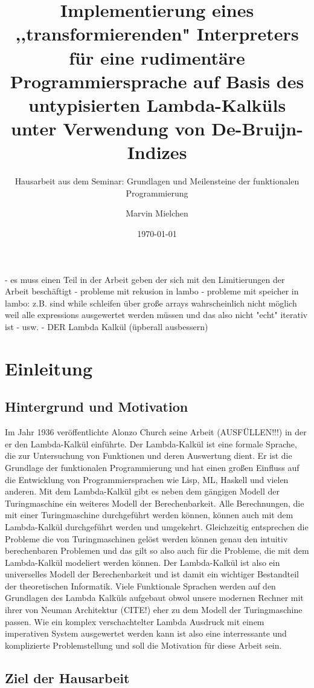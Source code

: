 \documentclass[ngerman]{article}
\title{Implementierung eines ,,transformierenden" Interpreters für eine rudimentäre Programmiersprache auf Basis des untypisierten Lambda-Kalküls unter Verwendung von De-Bruijn-Indizes}
\author{Marvin Mielchen}
\subtitle{Hausarbeit aus dem Seminar: Grundlagen und Meilensteine der funktionalen Programmierung}
\date{\today}
\begin{document}
\maketitle

- es muss einen Teil in der Arbeit geben der sich mit den Limitierungen der Arbeit beschäftigt
    - probleme mit rekusion in lambo
    - probleme mit speicher in lambo: z.B. sind while schleifen über große arrays wahrscheinlich nicht möglich weil alle expressions ausgewertet werden müssen und
    das also nicht "echt" iterativ ist
    - usw.
- DER Lambda Kalkül (üpberall ausbessern)

\section{Einleitung}

\subsection{Hintergrund und Motivation}

Im Jahr 1936 veröffentlichte Alonzo Church seine Arbeit (AUSFÜLLEN!!!) in der er den Lambda-Kalkül einführte. 
Der Lambda-Kalkül ist eine formale Sprache, die zur Untersuchung von Funktionen und deren Auswertung dient. Er ist die Grundlage der funktionalen Programmierung und hat einen großen Einfluss auf die Entwicklung von Programmiersprachen wie Lisp, ML, Haskell und vielen anderen.
Mit dem Lambda-Kalkül gibt es neben dem gängigen Modell der Turingmaschine ein weiteres Modell der Berechenbarkeit. Alle Berechnungen, die mit einer Turingmaschine durchgeführt werden können, können auch mit dem Lambda-Kalkül durchgeführt werden und umgekehrt.
Gleichzeitig entsprechen die Probleme die von Turingmaschinen gelöst werden können genau den intuitiv berechenbaren Problemen und das gilt so also auch für die Probleme, die mit dem Lambda-Kalkül modeliert werden können.
Der Lambda-Kalkül ist also ein universelles Modell der Berechenbarkeit und ist damit ein wichtiger Bestandteil der theoretischen Informatik. Viele Funktionale Sprachen werden auf den Grundlagen des Lambda Kalküls aufgebaut obwol unsere modernen Rechner mit ihrer von Neuman Architektur (CITE!) eher zu dem Modell der Turingmaschine passen.
Wie ein komplex verschachtelter Lambda Ausdruck mit einem imperativen System ausgewertet werden kann ist also eine interressante und komplizierte Problemstellung und soll die Motivation für diese Arbeit sein.

\subsection{Ziel der Hausarbeit}
\end{document}
